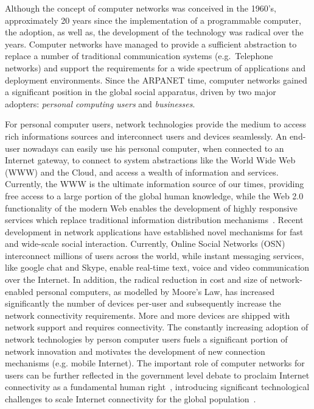 Although the concept of computer networks was conceived in the 1960's,
approximately 20 years since the implementation of a programmable computer, the
adoption, as well as, the development of the technology was radical over the
years. Computer networks have managed to provide a sufficient abstraction to
replace a number of traditional communication systems (e.g.~Telephone networks)
and support the requirements for a wide spectrum of applications and deployment
environments. Since the ARPANET time, computer networks gained a significant
position in the global social apparatus, driven by two major adopters: {\it personal
  computing users} and {\it businesses}.

For personal computer users, network technologies provide the medium to access
rich informations sources and interconnect users and devices seamlessly. An
end-user nowadays can easily use his personal computer, when connected to an
Internet gateway, to connect to system abstractions like the World Wide Web (WWW)
and the Cloud, and access a wealth of information and services.  Currently,
the WWW is the ultimate information source of our times, providing free access
to a large portion of the global human knowledge, while the Web 2.0
functionality of the modern Web enables the development of highly responsive
services which replace traditional information distribution
mechanisms~\cite{stempel2000}.  Recent development in network applications have
established novel mechanisms for fast and wide-scale social interaction.
Currently, Online Social Networks (OSN) interconnect millions of users across
the world, while instant messaging services, like google chat and Skype, enable
real-time text, voice and video communication over the Internet.  In addition,
the radical reduction in cost and size of network-enabled personal computers, as
modelled by Moore's Law, has increased significantly the number of devices
per-user and subsequently increase the network connectivity requirements.  More
and more devices are shipped with network support and 
requires connectivity. The constantly increasing adoption of network
technologies by person computer users fuels a significant portion of network
innovation and motivates the development of new connection mechanisms (e.g.
mobile Internet).  The important role of computer networks for users can be
further reflected in the government level debate to proclaim Internet
connectivity as a fundamental human right~\cite{klang2005human, Wicker2013},
introducing significant technological challenges to scale Internet connectivity
for the global population~\cite{cerf2012}.

